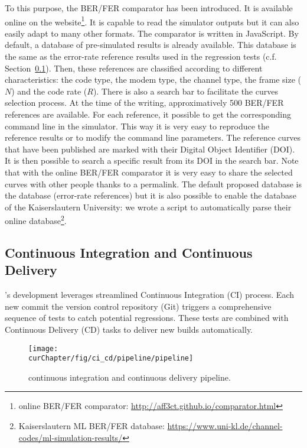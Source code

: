 To this purpose, the BER/FER comparator has been introduced. It is available
online on the \AFFECT website\footnote{\AFFECT online BER/FER comparator:
\url{http://aff3ct.github.io/comparator.html}}. It is capable to read the
\AFFECT simulator outputs but it can also easily adapt to many other formats.
The comparator is written in JavaScript. By default, a database of \AFFECT
pre-simulated results is already available. This database is the same as
the error-rate reference results used in the regression tests (c.f.
Section~\ref{sec:aff3ct_ci_cd}). Then, these references are classified according
to different characteristics: the code type, the modem type, the channel type,
the frame size ($N$) and the code rate ($R$). There is also a search bar to
facilitate the curves selection process. At the time of the writing,
approximatively 500 BER/FER references are available. For each reference, it
possible to get the corresponding command line in the \AFFECT simulator. This
way it is very easy to reproduce the reference results or to modify the command
line parameters. The reference curves that have been published are marked with
their Digital Object Identifier (DOI). It is then possible to search a specific
result from its DOI in the search bar. Note that with the online BER/FER
comparator it is very easy to share the selected curves with other people thanks
to a permalink. The default proposed database is the \AFFECT database
(error-rate references) but it is also possible to enable the database of the
Kaiserslautern University: we wrote a script to automatically parse their online
database\footnote{Kaiserslautern ML BER/FER database:
\url{https://www.uni-kl.de/channel-codes/ml-simulation-results/}}.

\subsection{Continuous Integration and Continuous Delivery}
\label{sec:aff3ct_ci_cd}

\AFFECT's development leverages streamlined Continuous Integration (CI) process.
Each new commit the version control repository (Git) triggers a comprehensive
sequence of tests to catch potential regressions. These tests are combined with
Continuous Delivery (CD) tasks to deliver new \AFFECT builds automatically.

\begin{figure}[htp]
  \centering
  \texttt{[image: \\curChapter/fig/ci\_cd/pipeline/pipeline]}
  \caption{\AFFECT continuous integration and continuous delivery pipeline.}
  \label{fig:aff3ct_ci_cd_pipeline}
\end{figure}

